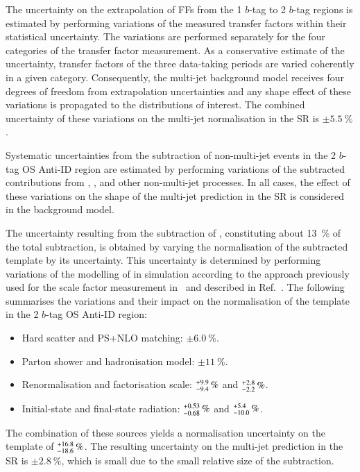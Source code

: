 The uncertainty on the extrapolation of FFs from the 1 $b$-tag to 2 $b$-tag
regions is estimated by performing variations of the measured transfer factors
within their statistical uncertainty. The variations are performed separately
for the four categories of the transfer factor measurement. As a conservative
estimate of the uncertainty, transfer factors of the three data-taking periods
are varied coherently in a given category. Consequently, the multi-jet
background model receives four degrees of freedom from extrapolation
uncertainties and any shape effect of these variations is propagated to the
distributions of interest. The combined uncertainty of these variations on the
multi-jet normalisation in the SR is $\pm \SI{5.5}{\percent}$.

Systematic uncertainties from the subtraction of non-multi-jet events in the 2
$b$-tag OS Anti-ID region are estimated by performing variations of the
subtracted contributions from \ttbarTrue, \ttbarFakes, and other non-multi-jet
processes. In all cases, the effect of these variations on the shape of the
multi-jet prediction in the SR is considered in the background model.

The uncertainty resulting from the subtraction of \ttbarTrue, constituting about
\SI{13}{\percent} of the total subtraction, is obtained by varying the
normalisation of the subtracted \ttbarTrue template by its uncertainty. This
uncertainty is determined by performing variations of the modelling of \ttbar in
simulation according to the approach previously used for the \ttbarFakes scale
factor measurement in~ and described in
Ref.~\cite{ATL-PHYS-PUB-2020-023}. The following summarises the variations and
their impact on the normalisation of the \ttbarTrue template in the 2 $b$-tag OS
Anti-ID region:
\begin{itemize}
\item Hard scatter and PS+NLO matching: $\pm\SI{6.0}{\percent}$.
\item Parton shower and hadronisation model: $\pm\SI{11}{\percent}$.
\item Renormalisation and factorisation scale:
  $\numpmerr{+9.9}{-9.4}\valuesep{\si{\percent}}$ and
  $\numpmerr{+2.8}{-2.2}\valuesep{\si{\percent}}$.

\item Initial-state and final-state radiation:
  $\numpmerr{+0.53}{-0.68}\valuesep{\si{\percent}}$ and
  $\numpmerr{+5.4}{-10.0}\valuesep{\si{\percent}}$.
\end{itemize}
The combination of these sources yields a normalisation uncertainty on the
\ttbarTrue template of $\numpmerr{+16.8}{-18.6}\valuesep{\si{\percent}}$. The
resulting uncertainty on the multi-jet prediction in the SR is
$\pm \SI{2.8}{\percent}$, which is small due to the small relative size of the
\ttbarTrue subtraction.

